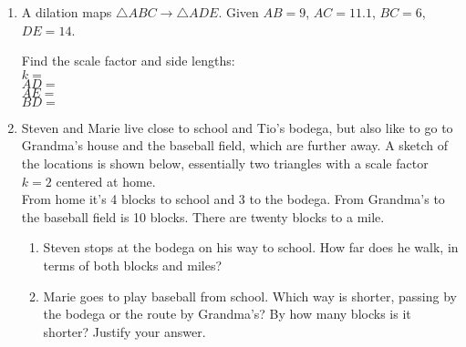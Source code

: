 \documentclass[12pt, twoside]{article}
\begin{document}
\begin{enumerate}
\newpage
\item A dilation maps $\triangle ABC \rightarrow \triangle ADE$. Given $AB=9$, $AC=11.1$, $BC=6$, $DE=14$. 
\begin{multicols}{2}
  Find the scale factor and side lengths:\\[0.5cm]
  $k=$\\[1cm]
  $AD=$\\[1cm]
  $AE=$\\[1cm]
  $BD=$\\
  \begin{flushright}
  \end{flushright}
\end{multicols}\vspace{0.25cm}

\item Steven and Marie live close to school and Tio's bodega, but also like to go to Grandma's house and the baseball field, which are further away. A sketch of the locations is shown below, essentially two triangles with a scale factor $k=2$ centered at home.\\[0.25cm]
From home it's 4 blocks to school and 3 to the bodega. From Grandma's to the baseball field is 10 blocks. There are twenty blocks to a mile.
\begin{enumerate}
  \item Steven stops at the bodega on his way to school. How far does he walk, in terms of both blocks and miles?
\begin{flushright}
\end{flushright} 
  \item Marie goes to play baseball from school. Which way is shorter, passing by the bodega or the route by Grandma's? By how many blocks is it shorter? Justify your answer.
\end{enumerate}


\end{enumerate}
\end{document}
